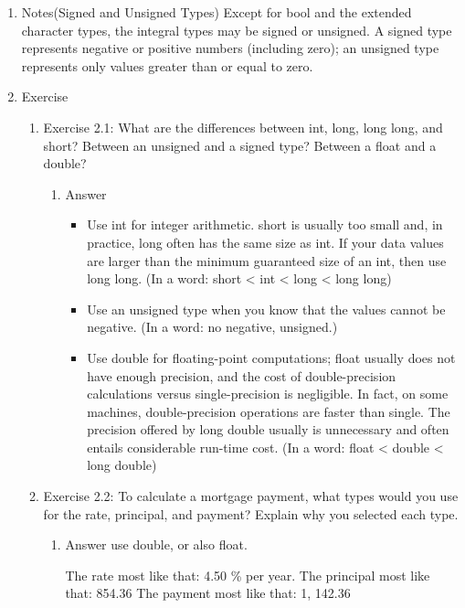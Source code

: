 \documentclass[11pt]{article}
\begin{document}
\begin{enumerate}
\item Notes(Signed and Unsigned Types)
\label{sec-2-1-1-1}
Except for bool and the extended character types, 
the integral types may be signed or unsigned. 
A signed type represents negative or positive numbers (including zero); 
an unsigned type represents only values greater than or equal to zero.
\item Exercise
\label{sec-2-1-1-2}
\begin{enumerate}
\item Exercise 2.1: What are the differences between int, long, long long, and short? Between an unsigned and a signed type? Between a float and a double?
\label{sec-2-1-1-2-1}
\begin{enumerate}
\item Answer
\label{sec-2-1-1-2-1-1}
\begin{itemize}
\item Use int for integer arithmetic. short is usually too small and, in practice, long often has the same size as int. If your data values are larger than the minimum guaranteed size of an int, then use long long. (In a word: short < int < long < long long)
\item Use an unsigned type when you know that the values cannot be negative. (In a word: no negative, unsigned.)
\item Use double for floating-point computations; float usually does not have enough precision, and the cost of double-precision calculations versus single-precision is negligible. In fact, on some machines, double-precision operations are faster than single. The precision offered by long double usually is unnecessary and often entails considerable run-time cost. (In a word: float < double < long double)
\end{itemize}
\end{enumerate}
\item Exercise 2.2: To calculate a mortgage payment, what types would you use for the rate, principal, and payment? Explain why you selected each type.
\label{sec-2-1-1-2-2}
\begin{enumerate}
\item Answer
\label{sec-2-1-1-2-2-1}
use double, or also float.

The rate most like that: 4.50 \% per year. The principal most like that: 854.36 The payment most like that: 1, 142.36
\end{enumerate}
\end{enumerate}
\end{enumerate}
\end{document}
